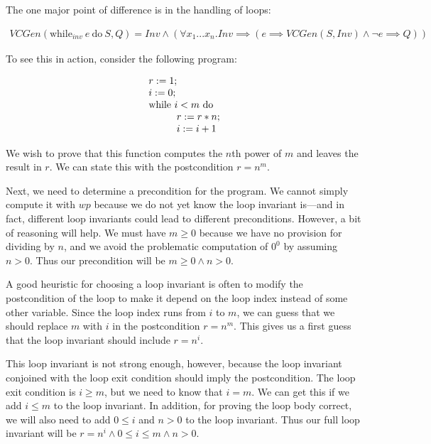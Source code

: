 \documentclass[11pt]{article}
\begin{document}

The one major point of difference is in the handling of loops:

\begin{center}
\[
\begin{array}{l}
VCGen(\mbox{while}_{inv} ~e~\mbox{do}~S, Q) = Inv \wedge (\forall x_1 ... x_n . Inv \implies ( e \implies VCGen(S, Inv) \wedge \neg e \implies Q) )
\end{array}
\]
\end{center}


To see this in action, consider the following \WhileLang program:

\[
\begin{array}{l}
r := 1;\\
i := 0;\\
\mbox{while}~ i<m ~\mbox{do} \\
\hspace{1cm} r:=r*n; \\
\hspace{1cm} i:=i+1
\end{array}
\]

We wish to prove that this function computes the $n$th power of $m$
and leaves the result in $r$.  We can state this with the
postcondition $r=n^m$.

Next, we need to determine a precondition for the program.  We cannot simply
compute it with $wp$ because we do not yet know the loop
invariant is---and in fact, different loop invariants could lead to
different preconditions.  However, a bit of reasoning will help.  We
must have $m \ge 0$ because we have no provision for dividing by $n$,
and we avoid the problematic computation of $0^0$ by assuming $n>0$.
Thus our precondition will be $m \ge 0 \land n > 0$.

A good heuristic for choosing a
loop invariant is often to modify the postcondition of the loop to
make it depend on the loop index instead of some other variable.
Since the loop index runs from $i$ to $m$, we can guess that we should
replace $m$ with $i$ in the postcondition $r=n^m$.  This gives us a
first guess that the loop invariant should include $r=n^i$.

This loop invariant is not strong enough, however, because the loop invariant conjoined with the
loop exit condition should imply the postcondition.  The loop exit
condition is $i \ge m$, but we need to know that $i = m$.  We can get
this if we add $i \le m$ to the loop invariant.  In addition, for
proving the loop body correct, we will also need to add $0 \le i$ and
$n > 0$ to the loop invariant.  Thus our full loop invariant
will be $r=n^i \land 0 \le i \le m \land n > 0$.
\end{document}
